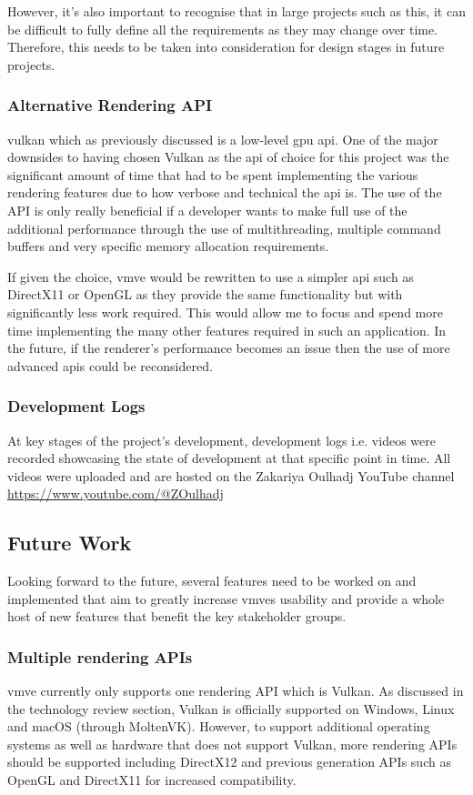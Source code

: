 \documentclass[11pt]{article}
\begin{document}
However, it's also important to recognise that in large projects such as this,
it can be difficult to fully define all the requirements as they may change over
time. Therefore, this needs to be taken into consideration for design stages in
future projects.

\subsubsection{Alternative Rendering API}
\gls*{vulkan} which as previously discussed is a low-level \gls*{gpu}
\gls*{api}. One of the major downsides to having chosen Vulkan as the \gls*{api}
of choice for this project was the significant amount of time that had to be
spent implementing the various rendering features due to how verbose and
technical the \gls*{api} is. The use of the API is only really beneficial if a
developer wants to make full use of the additional performance through the use
of multithreading, multiple command buffers and very specific memory allocation
requirements.

If given the choice, \gls*{vmve} would be rewritten to use a simpler \gls*{api}
such as DirectX11 or OpenGL as they provide the same functionality but with
significantly less work required. This would allow me to focus and spend more
time implementing the many other features required in such an application. In
the future, if the renderer's performance becomes an issue then the use of more
advanced \glspl*{api} could be reconsidered.

\subsubsection{Development Logs}
At key stages of the project's development, development logs i.e. videos were
recorded showcasing the state of development at that specific point in time. All
videos were uploaded and are hosted on the Zakariya Oulhadj YouTube channel
\url{https://www.youtube.com/@ZOulhadj}

\subsection{Future Work} \label{future_work} 
Looking forward to the future, several features need to be worked on and
implemented that aim to greatly increase \glspl*{vmve} usability and provide a
whole host of new features that benefit the key stakeholder groups.


\subsubsection{Multiple rendering APIs}
\gls*{vmve} currently only supports one rendering API which is Vulkan. As
discussed in the technology review section, Vulkan is officially supported on
Windows, Linux and macOS (through MoltenVK). However, to support additional
operating systems as well as hardware that does not support Vulkan, more
rendering APIs should be supported including DirectX12 and previous generation
APIs such as OpenGL and DirectX11 for increased compatibility.
\end{document}
